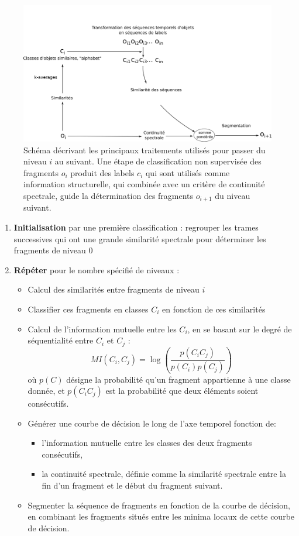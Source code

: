 \begin{figure}[t]
        \includegraphics[width=1.2\textwidth]{figures/alc_one_level.png}
       \caption{Schéma décrivant les principaux traitements utilisés pour passer du niveau $i$ au suivant. Une étape de classification non supervisée des fragments $o_i$ produit des labels $c_i$ qui sont utilisés comme information structurelle, qui combinée avec un critère de continuité spectrale, guide la détermination des fragments $o_{i+1}$ du niveau suivant.}\label{fig:alc}
\end{figure}

  \begin{enumerate}
  \item \textbf{Initialisation} par une première classification : regrouper les trames successives qui ont une grande similarité spectrale pour déterminer les fragments de niveau 0
  \item \textbf{Répéter} pour le nombre spécifié de niveaux :
    \begin{itemize}
    \item Calcul des similarités entre fragments de niveau $i$
    \item Classifier ces fragments en classes $C_i$ en fonction de ces similarités
    \item Calcul de l'information mutuelle entre les $C_i$, en se basant sur le degré de séquentialité entre $C_i$ et $C_j$ :
      \[ MI \left( C_i, C_j \right) = \log \left(\frac{p\left(C_iC_j\right)}{p\left(C_i\right)p\left(C_j\right)}\right) \]
      où $p(C)$ désigne la probabilité qu'un fragment appartienne à une classe donnée, et $p(C_iC_j)$ est la probabilité que deux éléments soient consécutifs.
    \item Générer une courbe de décision le long de l'axe temporel fonction de:
      \begin{itemize}
      \item l'information mutuelle entre les classes des deux fragments consécutifs,
      \item la continuité spectrale, définie comme la similarité spectrale entre la fin d'un fragment et le début du fragment suivant.
        \end{itemize}
    \item Segmenter la séquence de fragments en fonction de la courbe de décision, en combinant les fragments situés entre les minima locaux de cette courbe de décision.
    \end{itemize}
  \end{enumerate}

